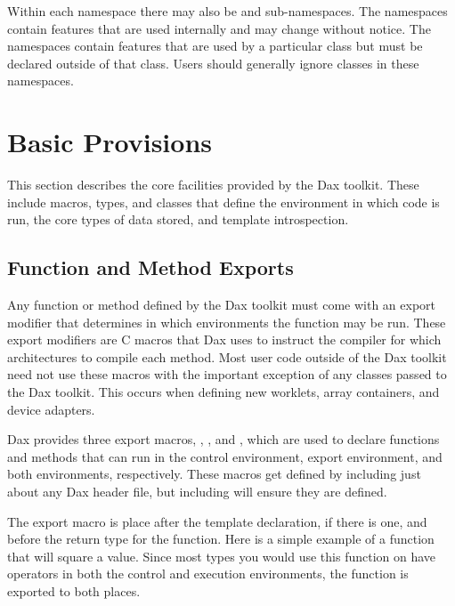 Within each namespace there may also
be 
and 
sub-namespaces. The  namespaces contain features
that are used internally and may change without
notice. The  namespaces contain features that are
used by a particular class but must be declared outside of that
class. Users should generally ignore classes in these namespaces.



\section{Basic Provisions}
\label{sec:BasicProvisions}

This section describes the core facilities provided by the Dax
toolkit. These include macros, types, and classes that define the
environment in which code is run, the core types of data stored, and
template introspection.

\subsection{Function and Method Exports}
\label{sec:FunctionAndMethodExports}

Any function or method defined by the Dax toolkit must come with an export
modifier that determines in which environments the function may be
run. These export modifiers are C macros that Dax uses to instruct the
compiler for which architectures to compile each method. Most user code
outside of the Dax toolkit need not use these macros with the important
exception of any classes passed to the Dax toolkit. This occurs when
defining new worklets, array containers, and device adapters.

Dax provides three export macros, \daxcontexport, \daxexecexport, and
\daxexeccontexport, which are used to declare functions and methods that
can run in the control environment, export environment, and both
environments, respectively. These macros get defined by including just
about any Dax header file, but including  will
ensure they are defined. 

The export macro is place after the template declaration, if there is one,
and before the return type for the function. Here is a simple example of a
function that will square a value. Since most types you would use this
function on have operators in both the control and execution environments,
the function is exported to both places.

